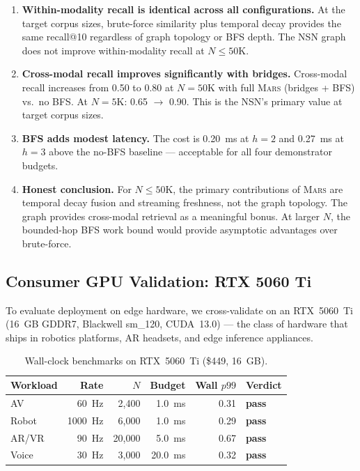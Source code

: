 \documentclass[11pt]{article}
\newcommand{\mars}{\textsc{Mars}}
\begin{document}
\begin{enumerate}
\item \textbf{Within-modality recall is identical across all
  configurations.} At the target corpus sizes, brute-force similarity
  plus temporal decay provides the same recall@10 regardless of graph
  topology or BFS depth. The NSN graph does not improve within-modality
  recall at $N \leq 50$K.

\item \textbf{Cross-modal recall improves significantly with bridges.}
  Cross-modal recall increases from 0.50 to 0.80 at $N{=}50$K with
  full \mars{} (bridges + BFS) vs.\ no BFS. At $N{=}5$K: 0.65
  $\to$ 0.90. This is the NSN's primary value at target corpus sizes.

\item \textbf{BFS adds modest latency.} The cost is 0.20~ms at
  $h{=}2$ and 0.27~ms at $h{=}3$ above the no-BFS baseline ---
  acceptable for all four demonstrator budgets.

\item \textbf{Honest conclusion.} For $N \leq 50$K, the primary
  contributions of \mars{} are temporal decay fusion and streaming
  freshness, not the graph topology. The graph provides cross-modal
  retrieval as a meaningful bonus. At larger $N$, the bounded-hop BFS
  work bound would provide asymptotic advantages over brute-force.
\end{enumerate}

\subsection{Consumer GPU Validation: RTX 5060 Ti}

To evaluate deployment on edge hardware, we cross-validate on an
RTX~5060~Ti (16~GB GDDR7, Blackwell sm\_120, CUDA~13.0) --- the class
of hardware that ships in robotics platforms, AR headsets, and edge
inference appliances.

\begin{table}[ht]
\centering
\small
\caption{Wall-clock benchmarks on RTX~5060~Ti (\$449, 16~GB).}
\label{tab:consumer}
\begin{tabular}{lrrrrl}
\toprule
\textbf{Workload} & \textbf{Rate} & \textbf{$N$} & \textbf{Budget} & \textbf{Wall $p99$} & \textbf{Verdict} \\
\midrule
AV       &   60~Hz &  2{,}400 &  1.0~ms & 0.31 & \textbf{pass} \\
Robot    & 1000~Hz &  6{,}000 &  1.0~ms & 0.29 & \textbf{pass} \\
AR/VR    &   90~Hz & 20{,}000 &  5.0~ms & 0.67 & \textbf{pass} \\
Voice    &   30~Hz &  3{,}000 & 20.0~ms & 0.32 & \textbf{pass} \\
\bottomrule
\end{tabular}
\end{table}
\end{document}
